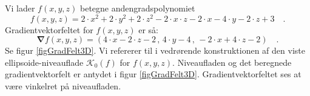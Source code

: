\begin{example} \label{exampGradFelter}
Vi lader $f(x,y,z)$ betegne andengradspolynomiet
\begin{equation}
f(x,y, z) =  2\cdot x^{2} + 2\cdot y^{2} + 2\cdot z^{2} - 2\cdot x \cdot z - 2\cdot x - 4\cdot y - 2 \cdot z +3 \quad .
\end{equation}
Gradientvektorfeltet for $f(x,y,z)$ er så:
\begin{equation}
\bm{\nabla}f(x,y,z) = ( 4\cdot x - 2\cdot z -2\, , \, 4\cdot y - 4 \, , \, -2\cdot x + 4 \cdot z - 2  ) \quad .
\end{equation}
Se  figur \ref{figGradFelt3D}. Vi refererer til  i   vedrørende konstruktionen af den viste ellipsoide-niveauflade $\mathcal{K}_{0}(f)$ for $f(x,y,z)$. Niveaufladen og det beregnede gradientvektorfelt er antydet i figur \ref{figGradFelt3D}. Gradientvektorfeltet ses at være vinkelret på niveaufladen.
\end{example}


